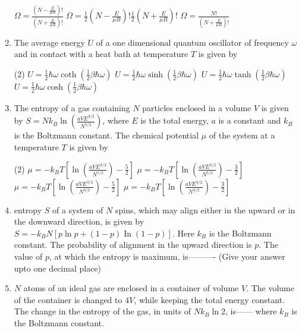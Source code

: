 \begin{enumerate}
\begin{tasks}
		\task[\textbf{B.}] $\Omega=\frac{\left(N-\frac{E}{\mu B}\right) !}{\left(N+\frac{E}{\mu B}\right) !}$
		\task[\textbf{C.}] $\Omega=\frac{1}{2}\left(N-\frac{E}{\mu B}\right) ! \frac{1}{2}\left(N+\frac{E}{\mu B}\right) !$
		\task[\textbf{D.}] $\Omega=\frac{N !}{\left(N+\frac{E}{\mu B}\right) !}$
	\end{tasks}
	\item The average energy $U$ of a one dimensional quantum oscillator of frequency $\omega$ and in contact with a heat bath at temperature $T$ is given by
	{}
	\begin{tasks}(2)
		\task[\textbf{A.}] $U=\frac{1}{2} \hbar \omega \operatorname{coth}\left(\frac{1}{2} \beta \hbar \omega\right)$
		\task[\textbf{B.}] $U=\frac{1}{2} \hbar \omega \sinh \left(\frac{1}{2} \beta \hbar \omega\right)$
		\task[\textbf{C.}] $U=\frac{1}{2} \hbar \omega \tanh \left(\frac{1}{2} \beta \hbar \omega\right)$
		\task[\textbf{D.}] $U=\frac{1}{2} \hbar \omega \cosh \left(\frac{1}{2} \beta \hbar \omega\right)$
	\end{tasks}
	\item  The entropy of a gas containing $N$ particles enclosed in a volume $V$ is given by $S=N k_{B} \ln \left(\frac{a V E^{3 / 2}}{N^{5 / 2}}\right)$, where $E$ is the total energy, $a$ is a constant and $k_{B}$ is the Boltzmann constant. The chemical potential $\mu$ of the system at a temperature $T$ is given by
	{}
	\begin{tasks}(2)
		\task[\textbf{A.}] $\mu=-k_{B} T\left[\ln \left(\frac{a V E^{3 / 2}}{N^{5 / 2}}\right)-\frac{5}{2}\right]$
		\task[\textbf{B.}] $\mu=-k_{B} T\left[\ln \left(\frac{a V E^{3 / 2}}{N^{5 / 2}}\right)-\frac{3}{2}\right]$
		\task[\textbf{C.}] $\mu=-k_{B} T\left[\ln \left(\frac{a V E^{3 / 2}}{N^{3 / 2}}\right)-\frac{5}{2}\right]$
		\task[\textbf{D.}] $\mu=-k_{B} T\left[\ln \left(\frac{a V E^{3 / 2}}{N^{3 / 2}}\right)-\frac{3}{2}\right]$
	\end{tasks}
	\item entropy $S$ of a system of $N$ spins, which may align either in the upward or in the downward direction, is given by $S=-k_{B} N[p \ln p+(1-p) \operatorname{In}(1-p)] .$ Here $k_{B}$ is the Boltzmann constant. The probability of alignment in the upward direction is $p$. The value of $p$, at which the entropy is maximum, is---------- (Give your answer upto one decimal place)
	{}
	\item 	$N$ atoms of an ideal gas are enclosed in a container of volume $V$. The volume of the container is changed to $4 V$, while keeping the total energy constant. The change in the entropy of the gas, in units of $N k_{B} \ln 2$, is------ where $k_{B}$ is the Boltzmann constant.

\end{enumerate}

